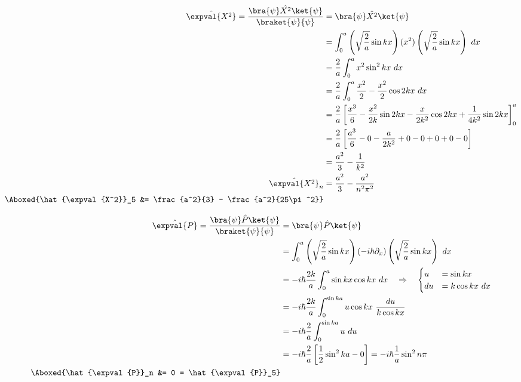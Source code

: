 \documentclass{article}
\begin{document}
\begin{enumerate}
		\begin{equation}
			\begin{split}
				\hat{\expval{X^2}} = \frac{\bra{\psi}\hat{X^2}\ket{\psi}}{\braket{\psi}{\psi}} &= \bra{\psi}\hat{X^2}\ket{\psi} \\
				&= \int_{0}^{a} \left( \sqrt{\frac{2}{a}} \sin kx \right) (x^2) \left( \sqrt{\frac{2}{a}} \sin kx \right) \ dx \\
				&= \frac{2}{a} \int_{0}^{a} x^2 \sin^2 kx \ dx \\
				&= \frac{2}{a} \int_{0}^{a} \frac{x^2}{2} - \frac{x^2}{2} \cos 2kx \ dx \\
				&= \frac{2}{a} \left[ \frac{x^3}{6} - \frac{x^2}{2k} \sin 2kx - \frac{x}{2k^2} \cos 2kx + \frac{1}{4k^2} \sin 2kx \right]^a_0 \\
				&= \frac{2}{a} \left[ \frac{a^3}{6} - 0 - \frac{a}{2k^2} + 0 - 0 + 0 + 0 - 0 \right] \\
				&= \frac{a^2}{3} - \frac{1}{k^2} \\
				\hat{\expval{X^2}}_n &= \frac{a^2}{3} - \frac{a^2}{n^2\pi^2} \\
				\Aboxed{\hat{\expval{X^2}}_5 &= \frac{a^2}{3} - \frac{a^2}{25\pi^2}}
			\end{split}
		\end{equation}
		
\clearpage
		
		\begin{equation}
			\begin{split}
				\hat{\expval{P}} = \frac{\bra{\psi}\hat{P}\ket{\psi}}{\braket{\psi}{\psi}} &= \bra{\psi}\hat{P}\ket{\psi} \\
				&= \int_{0}^{a} \left( \sqrt{\frac{2}{a}} \sin kx \right) (-i\hbar \partial_x) \left( \sqrt{\frac{2}{a}} \sin kx \right) \ dx \\
				&= -i\hbar \frac{2k}{a} \int_{0}^{a} \sin kx \cos kx \ dx \quad \Rightarrow \quad \begin{cases}
					u &= \sin kx \\
					du &= k \cos kx \ dx
				\end{cases} \\
				&= -i\hbar \frac{2k}{a} \int_{0}^{\sin ka} u \cos kx \ \frac{du}{k \cos kx} \\
				&= -i\hbar \frac{2}{a} \int_{0}^{\sin ka} u \ du \\
				&= -i\hbar \frac{2}{a} \left[ \frac{1}{2} \sin^2 ka - 0 \right] = -i\hbar \frac{1}{a} \sin^2 n\pi \\
				\Aboxed{\hat{\expval{P}}_n &= 0 = \hat{\expval{P}}_5}
			\end{split}
		\end{equation}
		

\end{enumerate}
\end{document}
